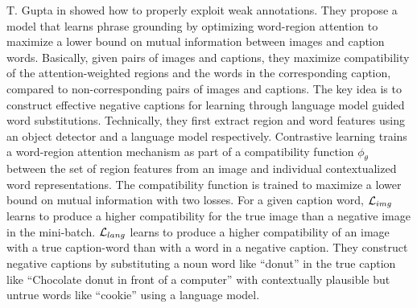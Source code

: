 T. Gupta \etal{} in \cite{gupta2020contrastive} showed how to properly
exploit weak annotations. They propose a model that learns phrase
grounding by optimizing word-region attention to maximize a lower
bound on mutual information between images and caption words.
Basically, given pairs of images and captions, they maximize
compatibility of the attention-weighted regions and the words in the
corresponding caption, compared to non-corresponding pairs of images
and captions. The key idea is to construct effective negative captions
for learning through language model guided word substitutions.
Technically, they first extract region and word features using an
object detector and a language model respectively. Contrastive
learning trains a word-region attention mechanism as part of a
compatibility function $\phi_\theta$ between the set of region
features from an image and individual contextualized word
representations. The compatibility function is trained to maximize a
lower bound on mutual information with two losses. For a given caption
word, $\mathcal{L}_{img}$ learns to produce a higher compatibility for the
true image than a negative image in the mini-batch. $\mathcal{L}_{lang}$
learns to produce a higher compatibility of an image with a true
caption-word than with a word in a negative caption. They construct
negative captions by substituting a noun word like ``donut'' in the
true caption like ``Chocolate donut in front of a computer'' with
contextually plausible but untrue words like ``cookie'' using a
language model.

